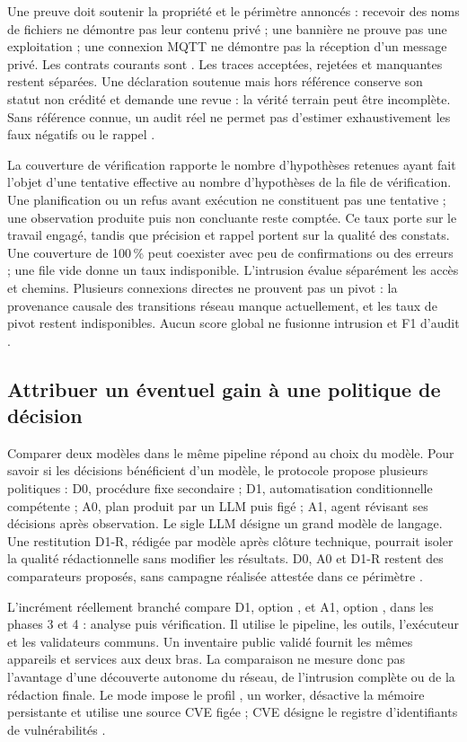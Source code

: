 \documentclass[11pt,a4paper]{article}
\DeclareRobustCommand{\code}[1]{{\small\path{#1}}}
\begin{document}
Une preuve doit soutenir la propriété et le périmètre annoncés : recevoir
des noms de fichiers ne démontre pas leur contenu privé ; une bannière ne
prouve pas une exploitation ; une connexion MQTT ne démontre pas la réception
d'un message privé. Les contrats courants sont
\code{strict-v3.16/evidence-v15}. Les traces acceptées, rejetées et manquantes
restent séparées. Une déclaration soutenue mais hors référence conserve son
statut non crédité et demande une revue : la vérité terrain peut être
incomplète. Sans référence connue, un audit réel ne permet pas d'estimer
exhaustivement les faux négatifs ou le rappel \cite{sec-evaluation,sec-contrat}.

La couverture de vérification rapporte le nombre d'hypothèses retenues ayant
fait l'objet d'une tentative effective au nombre d'hypothèses de la file de
vérification. Une planification ou un refus avant exécution ne constituent
pas une tentative ; une observation produite puis non concluante reste comptée.
Ce taux porte sur le travail engagé, tandis que précision et rappel portent
sur la qualité des constats. Une couverture de 100\,\% peut coexister avec peu
de confirmations ou des erreurs ; une file vide donne un taux indisponible.
L'intrusion évalue
séparément les accès et chemins. Plusieurs connexions directes ne prouvent
pas un pivot : la provenance causale des transitions réseau manque actuellement,
et les taux de pivot restent indisponibles. Aucun score global ne fusionne
intrusion et F1 d'audit \cite{sec-evaluation}.

\subsection{Attribuer un éventuel gain à une politique de décision}

Comparer deux modèles dans le même pipeline répond au choix du modèle.
Pour savoir si les décisions bénéficient d'un modèle, le protocole propose
plusieurs politiques : D0, procédure fixe secondaire ; D1, automatisation
conditionnelle compétente ; A0, plan produit par un LLM puis figé ; A1, agent
révisant ses décisions après observation. Le sigle LLM désigne un grand modèle
de langage. Une restitution D1-R, rédigée par modèle après clôture technique,
pourrait isoler la qualité rédactionnelle sans modifier les résultats.
D0, A0 et D1-R restent des comparateurs proposés, sans campagne réalisée
attestée dans ce périmètre \cite{intro-protocol,bench-cli}.

L'incrément réellement branché compare D1, option \code{rules}, et A1,
option \code{llm}, dans les phases 3 et 4 : analyse puis vérification.
Il utilise le pipeline, les outils, l'exécuteur et les validateurs communs.
Un inventaire public validé fournit les mêmes appareils et services aux deux
bras. La comparaison ne mesure donc pas l'avantage d'une découverte autonome
du réseau, de l'intrusion complète ou de la rédaction finale.
Le mode impose le profil \code{full}, un worker, désactive la mémoire
persistante et utilise une source CVE figée ; CVE désigne le registre
d'identifiants de vulnérabilités \cite{bench-cli,bench-policy-code}.
\end{document}

